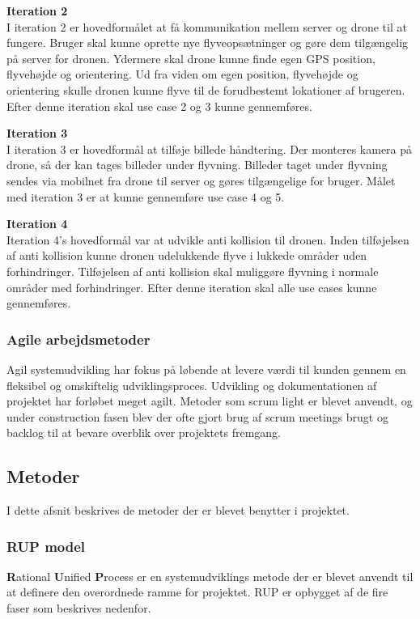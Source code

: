 \textbf{Iteration 2}\\
I iteration 2 er hovedformålet at få kommunikation mellem server og drone til at fungere. Bruger skal kunne oprette nye flyveopsætninger og gøre dem tilgængelig på server for dronen. Ydermere skal drone kunne finde egen GPS position, flyvehøjde og orientering. Ud fra viden om egen position, flyvehøjde og orientering skulle dronen kunne flyve til de forudbestemt lokationer af brugeren. Efter denne iteration skal use case 2 og 3 kunne gennemføres.

\textbf{Iteration 3}\\
I iteration 3 er hovedformål at tilføje billede håndtering. Der monteres kamera på drone, så der kan tages billeder under flyvning. Billeder taget under flyvning sendes via mobilnet fra drone til server og gøres tilgængelige for bruger. Målet med iteration 3 er at kunne gennemføre use case 4 og 5.

\textbf{Iteration 4}\\
Iteration 4's hovedformål var at udvikle anti kollision til dronen. Inden tilføjelsen af anti kollision kunne dronen udelukkende flyve i lukkede områder uden forhindringer. Tilføjelsen af anti kollision skal muliggøre flyvning i normale områder med forhindringer. Efter denne iteration skal alle use cases kunne gennemføres.


\subsubsection{Agile arbejdsmetoder}
Agil systemudvikling har fokus på løbende at levere værdi til kunden gennem en fleksibel og omskiftelig udviklingsproces. Udvikling og dokumentationen af projektet har forløbet meget agilt. Metoder som scrum light er blevet anvendt, og under construction fasen blev der ofte gjort brug af scrum meetings brugt og backlog til at bevare overblik over projektets fremgang.


\newpage
\subsection{Metoder}
I dette afsnit beskrives de metoder der er blevet benytter i projektet.

\subsubsection{RUP model}
\textbf{R}ational \textbf{U}nified \textbf{P}rocess er en systemudviklings metode der er blevet anvendt til at definere den overordnede ramme for projektet. RUP er opbygget af de fire faser som beskrives nedenfor.  

